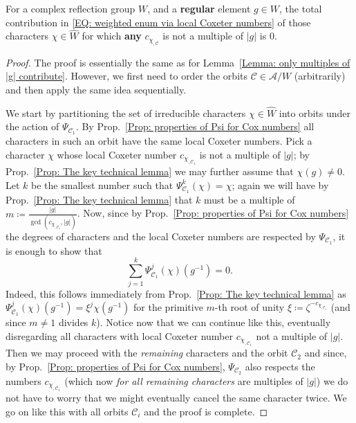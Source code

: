 \documentclass[ALCO, Unicode]{cedram}
\newcommand{\op}[1]{\operatorname{#1}}
\newcommand{\op}[1]{\operatorname{#1}}
\begin{document}
\begin{lemma}\label{Lemma: weigted enumeration only multiples of |g| contribute}
For a complex reflection group $W$, and a \textbf{regular} element $g\in W$, the total contribution in \eqref{EQ: weighted enum via local Coxeter numbers} of those characters $\chi\in\widehat{W}$ for which \textbf{any} $c_{\chi_{,\mathcal{C}}}$ is not a multiple of $|g|$ is $0$.
\end{lemma}
\begin{proof}
The proof is essentially the same as for Lemma~\ref{Lemma: only multiples of |g| contribute}. However, we first need to order the orbits $\mathcal{C}\in\mathcal{A}/W$ (arbitrarily) and then apply the same idea sequentially. 

We start by partitioning the set of irreducible characters $\chi\in\widehat{W}$ into orbits under the action of $\Psi_{\mathcal{C}_1}$. By Prop.~\ref{Prop: properties of Psi for Cox numbers} all characters in such an orbit have the same local Coxeter numbers. Pick a character $\chi$ whose local Coxeter number $c_{\chi_{,\mathcal{C}_1}}$ is not a multiple of $|g|$; by Prop.~\ref{Prop: The key technical lemma} we may further assume that $\chi(g)\neq 0$. Let $k$ be the smallest number such that $\Psi_{\mathcal{C}_1}^k(\chi)=\chi$; again we will have by Prop.~\ref{Prop: The key technical lemma} that $k$ must be a multiple of $m\coloneqq \frac{|g|}{\op{gcd}(c_{\chi_{,\mathcal{C}_1}},|g|)}$. Now, since by Prop.~\ref{Prop: properties of Psi for Cox numbers} the degrees of characters and the local Coxeter numbers are respected by $\Psi_{\mathcal{C}_1}$, it is enough to show that $$\sum_{j=1}^k\Psi^j_{\mathcal{C}_1}(\chi)(g^{-1})=0.$$ 
Indeed, this follows immediately from Prop.~\ref{Prop: The key technical lemma} as $\Psi_{\mathcal{C}_1}^j(\chi)(g^{-1})=\xi^j\chi(g^{-1})$ for the primitive $m$-th root of unity $\xi\coloneqq \zeta^{-c_{\chi_{,\mathcal{C}_1}}}$ (and since $m\neq 1$ divides $k$). Notice now that we can continue like this, eventually disregarding all characters with local Coxeter number $c_{\chi_{,\mathcal{C}_1}}$ not a multiple of $|g|$. Then we may proceed with the {\it remaining} characters and the orbit $\mathcal{C}_2$ and since, by Prop.~\ref{Prop: properties of Psi for Cox numbers}, $\Psi_{\mathcal{C}_2}$ also respects the numbers $c_{\chi_{,\mathcal{C}_1}}$ (which now \emph{for all remaining characters} are multiples of $|g|$) we do not have to worry that we might eventually cancel the same character twice. We go on like this with all orbits $\mathcal{C}_i$ and the proof is complete.
\end{proof}
\end{document}
